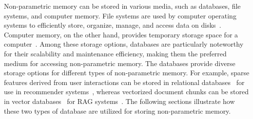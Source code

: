 \documentclass[journal,hideappendix]{vgtc}
\begin{document}
Non-parametric memory can be stored in various media, such as databases, file systems, and computer memory. File systems are used by computer operating systems to efficiently store, organize, manage, and access data on disks~\cite{ghemawat2003google,bovet2005understanding}. Computer memory, on the other hand, provides temporary storage space for a computer~\cite{kaxiras2008computer,hennessy2011computer}. Among these storage options, databases are particularly noteworthy for their scalability and maintenance efficiency, making them the preferred medium for accessing non-parametric memory. 
The databases provide diverse storage options for different types of non-parametric memory. For example, sparse features derived from user interactions can be stored in relational databases~\cite{codd2007relational} for use in recommender systems~\cite{ko2022survey}, whereas vectorized document chunks can be stored in vector databases~\cite{pan2023survey,han2023comprehensive} for RAG systems~\cite{gao2023retrieval,zhao2024retrieval}. The following sections illustrate how these two types of database are utilized for storing non-parametric memory.
\end{document}
